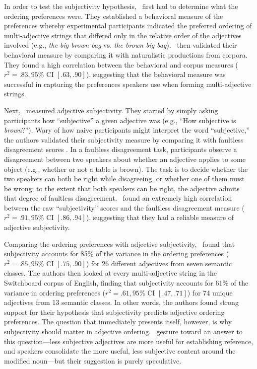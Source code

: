 \documentclass[10pt,a4paper]{article}
\begin{document}
In order to test the subjectivity hypothesis, ~first had to determine what the ordering preferences were. They established a behavioral measure of the preferences whereby experimental participants indicated the preferred ordering of multi-adjective strings that differed only in the relative order of the adjectives involved (e.g., \emph{the big brown bag} vs. \emph{the brown big bag}). ~then validated their behavioral measure by comparing it with naturalistic productions from corpora. They found a high correlation between the behavioral and corpus measures ($r^{2}=.83, 95\%$ CI $[.63, .90]$), suggesting that the behavioral measure was successful in capturing the preferences speakers use when forming multi-adjective strings.

Next, ~measured adjective subjectivity. They started by simply asking participants how ``subjective'' a given adjective was (e.g., ``How subjective is \emph{brown}?''). Wary of how naive participants might interpret the word ``subjective,'' the authors validated their subjectivity measure by comparing it with faultless disagreement scores \cite{kolbel2004,barker2013,kennedy2013,macfarlane2014}. In a faultless disagreement task, participants observe a disagreement between two speakers about whether an adjective applies to some object (e.g., whether or not a table is brown). The task is to decide whether the two speakers can both be right while disagreeing, or whether one of them must be wrong; to the extent that both speakers can be right, the adjective admits that degree of faultless disagreement. ~found an extremely high correlation between the raw ``subjectivity'' scores and the faultless disagreement measure ($r^{2}=.91, 95\%$ CI $[.86, .94]$), suggesting that they had a reliable measure of adjective subjectivity.

Comparing the ordering preferences with adjective subjectivity, ~found that subjectivity accounts for 85\% of the variance in the ordering preferences ($r^{2}=.85, 95\%$ CI $[.75, .90]$) for 26 different adjectives from seven semantic classes. The authors then looked at every multi-adjective string in the Switchboard corpus of English, finding that subjectivity accounts for 61\% of the variance in ordering preferences ($r^{2}=.61, 95\%$ CI $[.47, .71]$) for 74 unique adjectives from 13 semantic classes. In other words, the authors found strong support for their hypothesis that subjectivity predicts adjective ordering preferences. The question that immediately presents itself, however, is why subjectivity should matter in adjective ordering. ~gesture toward an answer to this question---less subjective adjectives are more useful for establishing reference, and speakers consolidate the more useful, less subjective content around the modified noun---but their suggestion is purely speculative.
\end{document}
